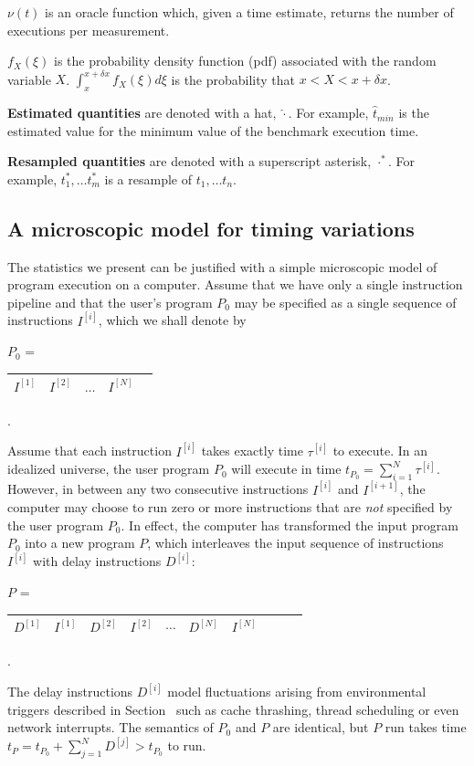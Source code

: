 \documentclass[conference]{IEEEtran}
\begin{document}
$\nu(t)$ is an oracle function which, given a time estimate, returns the number of executions per measurement.

$f_X(\xi)$ is the probability density function (pdf) associated with the random variable $X$. $\int_{x}^{x+\delta x} f_X(\xi) d\xi$ is the probability that $x < X < x+\delta x$.

\textbf{Estimated quantities} are denoted with a hat, $\hat\cdot$. For example, $\hat t_{min}$ is the estimated value for the minimum value of the benchmark execution time.

\textbf{Resampled quantities} are denoted with a superscript asterisk, $\cdot^*$. For example, $t^*_1, \dots t^*_m$ is a resample of $t_1, \dots t_n$.


\label{sec:statmodel}
\subsection{A microscopic model for timing variations}

The statistics we present can be justified with a simple microscopic
model of program execution on a computer.
Assume that we have only a single instruction pipeline
and that the user's program $P_0$ may be specified as a single sequence of instructions
$I^{[i]}$, which we shall denote by

$P_0$ = \begin{tabular}{|c|c|c|c|c|}
\hline
$I^{[1]}$ & $I^{[2]}$ & $\dots$ & $I^{[N]}$ \tabularnewline
\hline
\end{tabular}.

Assume that each instruction $I^{[i]}$ takes exactly time $\tau^{[i]}$ to execute.
In an idealized universe, the user program $P_0$ will execute in time
$t_{P_0} = \sum_{i=1}^N \tau^{[i]}$.
However, in between any two consecutive instructions $I^{[i]}$ and $I^{[i+1]}$,
the computer may choose to run zero or more instructions that are \textit{not}
specified by the user program $P_0$. In effect, the computer has transformed the
input program $P_0$ into a new program $P$, which interleaves the input sequence
of instructions $I^{[i]}$ with delay instructions $D^{[i]}$:

$P$ = \begin{tabular}{|c|c|c|c|c|c|c|c|c|c|}
\hline
$D^{[1]}$ & $I^{[1]}$ & $D^{[2]}$ & $I^{[2]}$ &
$\cdots$ & $D^{[N]}$ & $I^{[N]}$
\tabularnewline
\hline
\end{tabular}.

The delay instructions $D^{[i]}$ model fluctuations arising from environmental
triggers described in Section~\label{ref:intro} such as cache thrashing, thread
scheduling or even network interrupts. The semantics of $P_0$ and $P$ are
identical, but $P$ run takes time $t_P = t_{P_0} + \sum_{j=1}^N D^{[j]} > t_{P_0}$
to run.
\end{document}
